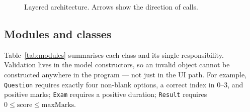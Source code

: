 \documentclass[11pt,a4paper]{article}
\begin{document}
\begin{figure}[H]
\centering
{}
\caption{Layered architecture. Arrows show the direction of calls.}
\label{fig:arch}
\end{figure}

\subsection{Modules and classes}
Table~\ref{tab:modules} summarises each class and its single responsibility.
Validation lives in the model constructors, so an invalid object cannot be
constructed anywhere in the program --- not just in the UI path. For example,
\texttt{Question} requires exactly four non-blank options, a correct index in
0--3, and positive marks; \texttt{Exam} requires a positive duration;
\texttt{Result} requires $0 \le \text{score} \le \text{maxMarks}$.
\end{document}
